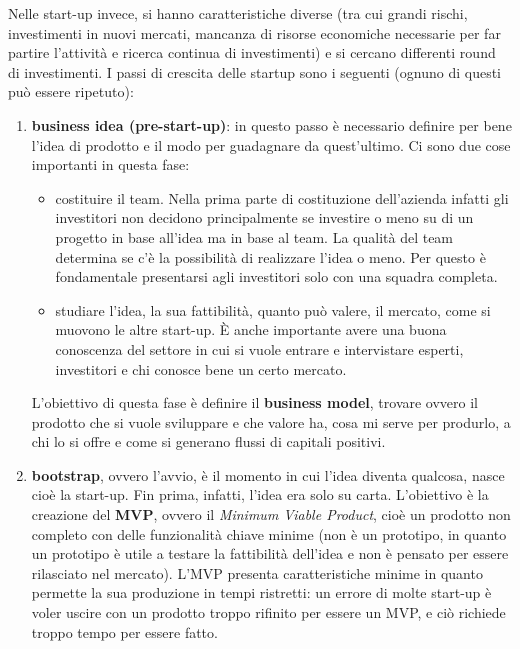 Nelle start-up invece, si hanno caratteristiche diverse (tra cui grandi rischi,
investimenti in nuovi mercati, mancanza di risorse economiche necessarie per
far partire l'attività e ricerca continua di investimenti) e si cercano
differenti round di investimenti. I passi di crescita delle startup sono i
seguenti (ognuno di questi può essere ripetuto):
\begin{enumerate}
 \item \textbf{business idea (pre-start-up)}: in questo passo è necessario
 definire per bene l'idea di prodotto e il modo per guadagnare da quest'ultimo.
 Ci sono due cose importanti in questa fase:
 \begin{itemize}
  \item costituire il team. Nella prima parte di costituzione dell'azienda
  infatti gli investitori non decidono principalmente se investire o meno su di
  un progetto in base all'idea ma in base al team. La qualità del team
  determina se c'è la possibilità di realizzare l'idea o meno. Per questo è
  fondamentale presentarsi agli investitori solo con una squadra completa.

  \item studiare l'idea, la sua fattibilità, quanto può valere, il mercato,
  come si muovono le altre start-up. È anche importante avere una buona
  conoscenza del settore in cui si vuole entrare e intervistare esperti,
  investitori e chi conosce bene un certo mercato.
 \end{itemize}
 L'obiettivo di questa fase è definire il \textbf{business model}, trovare
 ovvero il prodotto che si vuole sviluppare e che valore ha, cosa mi serve per
 produrlo, a chi lo si offre e come si generano flussi di capitali positivi.

 \item \textbf{bootstrap}, ovvero l'avvio, è il momento in cui l'idea diventa
 qualcosa, nasce cioè la start-up. Fin prima, infatti, l'idea era solo su carta.
 L'obiettivo è la creazione del \textbf{MVP}, ovvero il \textit{Minimum Viable
 Product}, cioè un prodotto non completo con delle funzionalità chiave minime
 (non è un prototipo, in quanto un prototipo è utile a testare la fattibilità
 dell'idea e non è pensato per essere rilasciato nel mercato). L'MVP presenta
 caratteristiche minime in quanto permette la sua produzione in tempi ristretti:
 un errore di molte start-up è voler uscire con un prodotto troppo rifinito per
 essere un MVP, e ciò richiede troppo tempo per essere fatto.


\end{enumerate}
